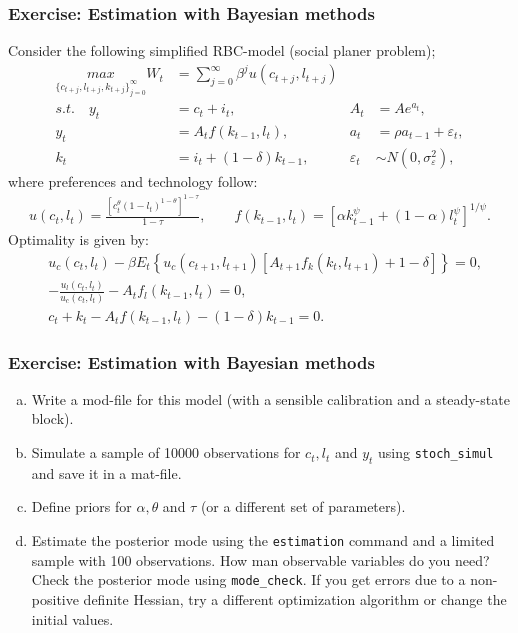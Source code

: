 \documentclass[handout]{beamer}  %
\newcounter{saveenumi}
\newcommand{\seti}{\setcounter{saveenumi}{\value{enumi}}}
\begin{document}
\begin{frame}\frametitle{Exercise: Estimation with Bayesian methods}
Consider the following simplified RBC-model (social planer problem);
\begin{align*}
  \underset{\{c_{t+j},l_{t+j},k_{t+j}\}_{j=0}^\infty}{max} W_t &= \sum_{j=0}^\infty \beta^j u(c_{t+j},l_{t+j})\\
  s.t.\quad y_t &= c_t + i_t, & A_t &= A e^{a_t}, \\
  y_t &= A_t f(k_{t-1},l_t), & a_t &= \rho a_{t-1} + \varepsilon_t,\\
  k_t &= i_t +(1-\delta)k_{t-1}, &  \varepsilon_t &\sim N(0,\sigma_{\varepsilon}^2),
\end{align*}
where preferences and technology follow:
\begin{align*}
  u(c_t,l_t)= \frac{\left[c_t^\theta (1-l_t)^{1-\theta}\right]^{1-\tau}}{1-\tau}, \qquad f(k_{t-1},l_t)=\left[\alpha k_{t-1}^\psi + (1-\alpha)l_t^\psi\right]^{1/\psi}.
\end{align*}
Optimality is given by:
\begin{eqnarray*}
 &u_c(c_t,l_t) - \beta E_t \left\{u_c(c_{t+1},l_{t+1}) \left[A_{t+1} f_k(k_t, l_{t+1})+1-\delta \right]\right\} = 0,\\
 & -\frac{u_l(c_t,l_t)}{u_c(c_t,l_t)}-A_t f_l(k_{t-1},l_t)=0,\\
 & c_t + k_t -A_t f(k_{t-1},l_t) -(1-\delta)k_{t-1}=0.
\end{eqnarray*}
\end{frame}

\begin{frame}\frametitle{Exercise: Estimation with Bayesian methods}
\begin{enumerate}[(a)]
  \item Write a mod-file for this model (with a sensible calibration and a steady-state block).
  \item Simulate a sample of 10000 observations for $c_t,l_t$ and $y_t$ using \texttt{stoch\_simul} and save it in a mat-file.
  \item Define priors for $\alpha,\theta$ and $\tau$ (or a different set of parameters).
  \item Estimate the posterior mode using the \texttt{estimation} command and a limited sample with 100 observations. How man observable variables do you need? Check the posterior mode using \texttt{mode\_check}. If you get errors due to a non-positive definite Hessian, try a different optimization algorithm or change the initial values.
\seti
\end{enumerate}
\end{frame}
\end{document}
